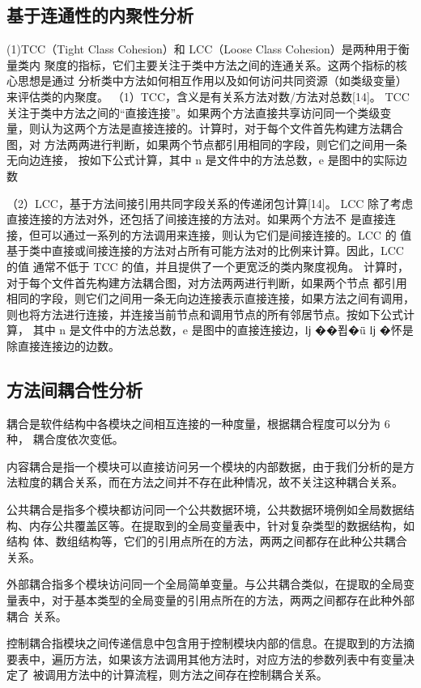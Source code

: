 \subsection{基于连通性的内聚性分析}
(1)TCC（Tight Class Cohesion）和 LCC（Loose Class Cohesion）是两种用于衡量类内
聚度的指标，它们主要关注于类中方法之间的连通关系。这两个指标的核心思想是通过
分析类中方法如何相互作用以及如何访问共同资源（如类级变量）来评估类的内聚度。
（1）TCC，含义是有关系方法对数/方法对总数[14]。
TCC 关注于类中方法之间的“直接连接”。如果两个方法直接共享访问同一个类级变
量，则认为这两个方法是直接连接的。计算时，对于每个文件首先构建方法耦合图，对
方法两两进行判断，如果两个节点都引用相同的字段，则它们之间用一条无向边连接，
按如下公式计算，其中 n 是文件中的方法总数，e 是图中的实际边数

（2）LCC，基于方法间接引用共同字段关系的传递闭包计算[14]。
LCC 除了考虑直接连接的方法对外，还包括了间接连接的方法对。如果两个方法不
是直接连接，但可以通过一系列的方法调用来连接，则认为它们是间接连接的。LCC 的
值基于类中直接或间接连接的方法对占所有可能方法对的比例来计算。因此，LCC 的值
通常不低于 TCC 的值，并且提供了一个更宽泛的类内聚度视角。
计算时，对于每个文件首先构建方法耦合图，对方法两两进行判断，如果两个节点
都引用相同的字段，则它们之间用一条无向边连接表示直接连接，如果方法之间有调用，
则也将方法进行连接，并连接当前节点和调用节点的所有邻居节点。按如下公式计算，
其中 n 是文件中的方法总数，e 是图中的直接连接边，ǉ ��푑�ǖ ǉ �怀是除直接连接边的边数。


\subsection{方法间耦合性分析}

耦合是软件结构中各模块之间相互连接的一种度量，根据耦合程度可以分为 6 种，
耦合度依次变低。


内容耦合是指一个模块可以直接访问另一个模块的内部数据，由于我们分析的是方
法粒度的耦合关系，而在方法之间并不存在此种情况，故不关注这种耦合关系。


公共耦合是指多个模块都访问同一个公共数据环境，公共数据环境例如全局数据结
构、内存公共覆盖区等。在提取到的全局变量表中，针对复杂类型的数据结构，如结构
体、数组结构等，它们的引用点所在的方法，两两之间都存在此种公共耦合关系。


外部耦合指多个模块访问同一个全局简单变量。与公共耦合类似，在提取的全局变
量表中，对于基本类型的全局变量的引用点所在的方法，两两之间都存在此种外部耦合
关系。


控制耦合指模块之间传递信息中包含用于控制模块内部的信息。在提取到的方法摘
要表中，遍历方法，如果该方法调用其他方法时，对应方法的参数列表中有变量决定了
被调用方法中的计算流程，则方法之间存在控制耦合关系。


